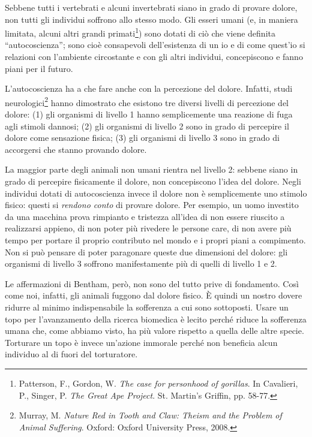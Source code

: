 \documentclass[a4paper,11pt,oneside,article]{memoir}
\begin{document}
Sebbene tutti i vertebrati e alcuni invertebrati siano in grado di provare
dolore, non tutti gli individui soffrono allo stesso modo. Gli esseri umani (e,
in maniera limitata, alcuni altri grandi primati\footnote{Patterson, F., Gordon,
W. \emph{The case for personhood of gorillas}. In Cavalieri, P., Singer, P.
\emph{The Great Ape Project}. St. Martin's Griffin, pp. 58-77.}) sono dotati di
ciò che viene definita ``autocoscienza''; sono cioè consapevoli dell'esistenza
di un io e di come quest'io si relazioni con l'ambiente circostante e con gli
altri individui, concepiscono e fanno piani per il futuro.

L'autocoscienza ha a che fare anche con la percezione del dolore. Infatti, studi
neurologici\footnote{Murray, M. \emph{Nature Red in Tooth and Claw: Theism and
the Problem of Animal Suffering}. Oxford: Oxford University Press, 2008.} hanno
dimostrato che esistono tre diversi livelli di percezione del dolore: (1) gli
organismi di livello 1 hanno semplicemente una reazione di fuga agli stimoli
dannosi; (2) gli organismi di livello 2 sono in grado di percepire il dolore
come sensazione fisica; (3) gli organismi di livello 3 sono in grado di
accorgersi che stanno provando dolore.

La maggior parte degli animali non umani rientra nel livello 2: sebbene siano in
grado di percepire fisicamente il dolore, non concepiscono l'idea del dolore.
Negli individui dotati di autocoscienza invece il dolore non è semplicemente uno
stimolo fisico: questi si \emph{rendono conto} di provare dolore. Per esempio,
un uomo investito da una macchina prova rimpianto e tristezza all'idea di non
essere riuscito a realizzarsi appieno, di non poter più rivedere le persone
care, di non avere più tempo per portare il proprio contributo nel mondo e i
propri piani a compimento. Non si può pensare di poter paragonare queste due
dimensioni del dolore: gli organismi di livello 3 soffrono manifestamente più
di quelli di livello 1 e 2.

Le affermazioni di Bentham, però, non sono del tutto prive di fondamento. Così
come noi, infatti, gli animali fuggono dal dolore fisico. È quindi un nostro
dovere ridurre al minimo indispensabile la sofferenza a cui sono sottoposti.
Usare un topo per l'avanzamento della ricerca biomedica è lecito perché riduce
la sofferenza umana che, come abbiamo visto, ha più valore rispetto a quella
delle altre specie. Torturare un topo è invece un'azione immorale perché non
beneficia alcun individuo al di fuori del torturatore.
\end{document}

